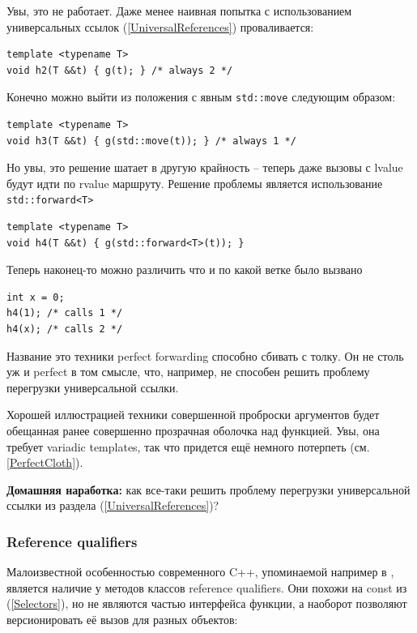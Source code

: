 \documentclass[a4paper,12pt,oneside]{article}
\begin{document}
Увы, это не работает. Даже менее наивная попытка с использованием универсальных ссылок (\ref{UniversalReferences}) проваливается:

\begin{lstlisting}
template <typename T>
void h2(T &&t) { g(t); } /* always 2 */
\end{lstlisting}

Конечно можно выйти из положения с явным \lstinline!std::move! следующим образом:

\begin{lstlisting}
template <typename T>
void h3(T &&t) { g(std::move(t)); } /* always 1 */
\end{lstlisting}

Но увы, это решение шатает в другую крайность -- теперь даже вызовы с lvalue будут идти по rvalue маршруту. Решение проблемы является использование \lstinline!std::forward<T>!

\begin{lstlisting}
template <typename T>
void h4(T &&t) { g(std::forward<T>(t)); }
\end{lstlisting}

Теперь наконец-то можно различить что и по какой ветке было вызвано

\begin{lstlisting}
int x = 0;
h4(1); /* calls 1 */
h4(x); /* calls 2 */
\end{lstlisting}

Название это техники perfect forwarding способно сбивать с толку. Он не столь уж и perfect в том смысле, что, например, не способен решить проблему перегрузки универсальной ссылки.

Хорошей иллюстрацией техники совершенной проброски аргументов будет обещанная ранее совершенно прозрачная оболочка над функцией. Увы, она требует variadic templates, так что придется ещё немного потерпеть (см. \ref{PerfectCloth}).

\textbf{Домашняя наработка:} как все-таки решить проблему перегрузки универсальной ссылки из раздела (\ref{UniversalReferences})?

\subsubsection{Reference qualifiers}

Малоизвестной особенностью современного C++, упоминаемой например в \cite{effmoderncpp}, является наличие у методов классов reference qualifiers. Они похожи на const из (\ref{Selectors}), но не являются частью интерфейса функции, а наоборот позволяют версионировать её вызов для разных объектов:
\end{document}
